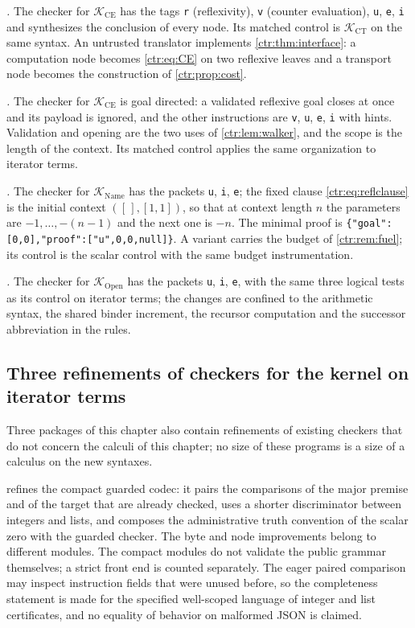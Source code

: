 \emph{.} The checker for $\mathcal K_{\mathrm{CE}}$ has the tags
\texttt{r} (reflexivity), \texttt{v} (counter evaluation), \texttt{u}, \texttt{e},
\texttt{i} and synthesizes the conclusion of every node. Its matched control is
$\mathcal K_{\mathrm{CT}}$ on the same syntax. An untrusted translator implements
\cref{ctr:thm:interface}: a computation node becomes \eqref{ctr:eq:CE} on two reflexive
leaves and a transport node becomes the construction of \cref{ctr:prop:cost}.

\emph{.} The checker for $\mathcal K_{\mathrm{CE}}$ is goal directed:
a validated reflexive goal closes at once and its payload is ignored, and the other
instructions are \texttt{v}, \texttt{u}, \texttt{e}, \texttt{i} with hints. Validation and
opening are the two uses of \cref{ctr:lem:walker}, and the scope is the length of the
context. Its matched control applies the same organization to iterator terms.

\emph{.} The checker for $\mathcal K_{\mathrm{Name}}$ has the
packets \texttt{u}, \texttt{i}, \texttt{e}; the fixed clause \eqref{ctr:eq:reflclause} is
the initial context $([\,],[1,1])$, so that at context length $n$ the parameters are
$-1,\dots,-(n-1)$ and the next one is $-n$. The minimal proof is
\texttt{\{"goal":[0,0],"proof":["u",0,0,null]\}}. A variant carries the budget of
\cref{ctr:rem:fuel}; its control is the scalar control with the same budget instrumentation.

\emph{.} The checker for $\mathcal K_{\mathrm{Open}}$ has the
packets \texttt{u}, \texttt{i}, \texttt{e}, with the same three logical tests as its
control on iterator terms; the changes are confined to the arithmetic syntax, the shared
binder increment, the recursor computation and the successor abbreviation in the rules.

\subsection{Three refinements of checkers for the kernel on iterator terms}

Three packages of this chapter also contain refinements of existing checkers that do not
concern the calculi of this chapter; no size of these programs is a size of a calculus on
the new syntaxes.

 refines the compact guarded codec: it pairs the comparisons of
the major premise and of the target that are already checked, uses a shorter discriminator
between integers and lists, and composes the administrative truth convention of the scalar
zero with the guarded checker. The byte and node improvements belong to different modules.
The compact modules do not validate the public grammar themselves; a strict front end is
counted separately. The eager paired comparison may inspect instruction fields that were
unused before, so the completeness statement is made for the specified well-scoped language
of integer and list certificates, and no equality of behavior on malformed JSON is claimed.

